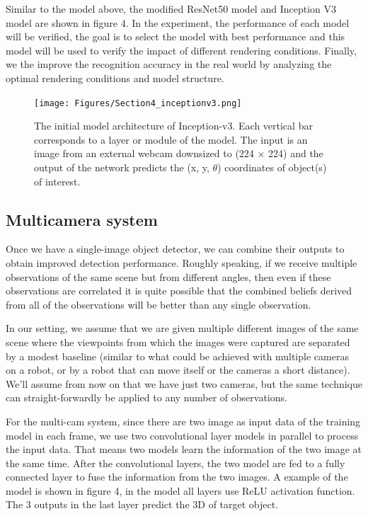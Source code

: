 Similar to the model above, the modified ResNet50 model and Inception V3 model are shown in figure 4. In the experiment, the performance of each model will be verified, the goal is to select the model with best performance and this model will be used to verify the impact of different rendering conditions. Finally, we the improve the recognition accuracy in the real world by analyzing the optimal rendering conditions and model structure.

\begin{figure}[h]
	\texttt{[image: Figures/Section4\_inceptionv3.png]} 
	\centering
	\caption{The initial model architecture of Inception-v3. Each vertical bar corresponds to a layer or module of the model. The input is an image from an external webcam downsized to (224 × 224) and the output of the network predicts the (x, y, $\theta$) coordinates of object(s) of interest.}
	\label{fig:inceptionv3}
\end{figure}

\subsection{Multicamera system}
Once we have a single-image object detector, we can combine their outputs to obtain improved detection performance. Roughly speaking, if we receive multiple observations of the same scene but from different angles, then even if these observations are correlated it is quite possible that the combined beliefs derived from all of the observations will be better than any single observation\cite{coates2010multi}. 


In our setting, we assume that we are given multiple different images of the same scene where the viewpoints from which the images were captured are separated by a modest baseline (similar to what could be achieved with multiple cameras on a robot, or by a robot that can move itself or the cameras a short distance). We’ll assume from now on that we have just two cameras, but the same technique can straight-forwardly be applied to any number of observations.

For the multi-cam system, since there are two image as input data of the training model in each frame, we use two convolutional layer models in parallel to process the input data. That means two models learn the information of the two image at the same time. After the convolutional layers, the two model are fed to a fully connected layer to fuse the information from the two images. A example of the model is shown in figure 4, in the model all layers use ReLU \cite{nair2010rectified} activation function. The 3 outputs in the last layer predict the 3D of target object.

